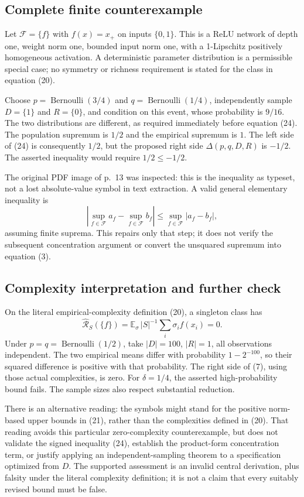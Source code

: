 \documentclass[10pt]{article}
\begin{document}
\subsection*{Complete finite counterexample}
Let \(\mathcal F=\{f\}\) with \(f(x)=x_+\) on inputs \(\{0,1\}\). This is a ReLU network of depth one, weight norm one, bounded input norm one, with a 1-Lipschitz positively homogeneous activation. A deterministic parameter distribution is a permissible special case; no symmetry or richness requirement is stated for the class in equation (20).\par
Choose \(p=\operatorname{Bernoulli}(3/4)\) and \(q=\operatorname{Bernoulli}(1/4)\), independently sample \(D=\{1\}\) and \(R=\{0\}\), and condition on this event, whose probability is \(9/16\). The two distributions are different, as required immediately before equation (24). The population supremum is \(1/2\) and the empirical supremum is \(1\). The left side of (24) is consequently \(1/2\), but the proposed right side \(\Delta(p,q,D,R)\) is \(-1/2\). The asserted inequality would require \(1/2\leq-1/2\).\par
The original PDF image of p. 13 was inspected: this is the inequality as typeset, not a lost absolute-value symbol in text extraction. A valid general elementary inequality is \[\left|\sup_{f\in\mathcal F}a_f-\sup_{f\in\mathcal F}b_f\right|
 \leq \sup_{f\in\mathcal F}|a_f-b_f|,\] assuming finite suprema. This repairs only that step; it does not verify the subsequent concentration argument or convert the unsquared supremum into equation (3).\par
\subsection*{Complexity interpretation and further check}
On the literal empirical-complexity definition (20), a singleton class has \[\widehat{\mathcal R}_S(\{f\})
 =\mathbb E_\sigma\,|S|^{-1}\sum_i\sigma_i f(x_i)=0.\] Under \(p=q=\operatorname{Bernoulli}(1/2)\), take \(|D|=100\), \(|R|=1\), all observations independent. The two empirical means differ with probability \(1-2^{-100}\), so their squared difference is positive with that probability. The right side of (7), using those actual complexities, is zero. For \(\delta=1/4\), the asserted high-probability bound fails. The sample sizes also respect substantial reduction.\par
There is an alternative reading: the symbols might stand for the positive norm-based upper bounds in (21), rather than the complexities defined in (20). That reading avoids this particular zero-complexity counterexample, but does not validate the signed inequality (24), establish the product-form concentration term, or justify applying an independent-sampling theorem to a specification optimized from \(D\). The supported assessment is an invalid central derivation, plus falsity under the literal complexity definition; it is not a claim that every suitably revised bound must be false.\par
\end{document}
